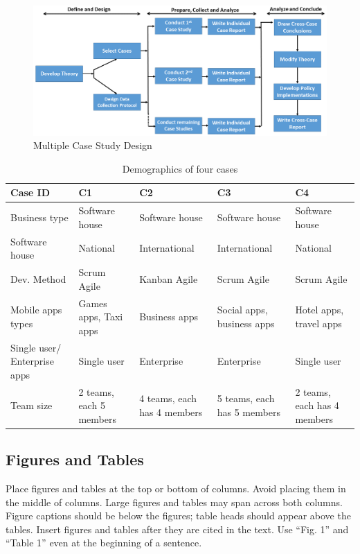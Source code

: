 \documentclass[fleqn,10pt]{thescipub} %
\begin{document}
\begin{figure}[ht]\centering %
\includegraphics[width=\linewidth]{Multiple_case-study_design}
\caption{Multiple Case Study Design \citep{yin2013case}}
\label{Fig.Multiple_case-study_design}
\end{figure}

\begin{table}[!hbt]
\caption{Demographics of four cases}
\centering
\begin{tabular}{ p{3cm}  p{3cm} p{3cm} p{3cm} p{3cm} }
\toprule
Case ID &   C1	&	C2	&	C3	&	C4 \\
\midrule
Business type & Software house & Software house & Software house & Software house \\
Software house & National & International & International & National\\
Dev. Method & Scrum Agile & Kanban Agile & Scrum Agile & Scrum Agile \\
Mobile apps types & Games apps, Taxi apps & Business apps & Social apps, business apps & Hotel apps, travel apps\\
Single user/ Enterprise apps & Single user& Enterprise & Enterprise&Single user \\
Team size& 2 teams, each 5 members & 4 teams, each has 4 members & 5 teams, each has 5 members & 2 teams, each has 4 members\\
\bottomrule
\end{tabular}
\label{table:demographics_info}
\end{table}

\subsection{Figures and Tables} 
Place figures and tables at the top or bottom of columns. Avoid placing them in the middle of columns. Large figures and tables may span across both columns. Figure captions should be below the figures; table heads should appear above the tables. Insert figures and tables after they are cited in the text. Use “Fig. 1” and “Table 1” even at the beginning of a sentence.
\end{document}
